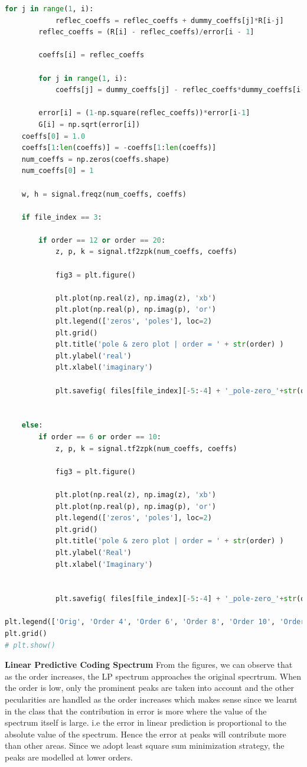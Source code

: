 \documentclass[a4paper]{article}
\begin{document}
\begin{lstlisting}[language=Python, caption=q2a.py]
        for j in range(1, i):
            reflec_coeffs = reflec_coeffs + dummy_coeffs[j]*R[i-j]
        reflec_coeffs = (R[i] - reflec_coeffs)/error[i - 1]

        coeffs[i] = reflec_coeffs

        for j in range(1, i):
            coeffs[j] = dummy_coeffs[j] - reflec_coeffs*dummy_coeffs[i-j]

        error[i] = (1-np.square(reflec_coeffs))*error[i-1]
        G[i] = np.sqrt(error[i])
    coeffs[0] = 1.0
    coeffs[1:len(coeffs)] = -coeffs[1:len(coeffs)]
    num_coeffs = np.zeros(coeffs.shape)
    num_coeffs[0] = 1
    
    w, h = signal.freqz(num_coeffs, coeffs)

    if file_index == 3:

        if order == 12 or order == 20:
            z, p, k = signal.tf2zpk(num_coeffs, coeffs)

            fig3 = plt.figure()
            
            plt.plot(np.real(z), np.imag(z), 'xb')
            plt.plot(np.real(p), np.imag(p), 'or')
            plt.legend(['zeros', 'poles'], loc=2)
            plt.grid()
            plt.title('pole & zero plot | order = ' + str(order) )
            plt.ylabel('real')
            plt.xlabel('imaginary')
            
            plt.savefig( files[file_index][-5:-4] + '_pole-zero_'+str(order)+'_.png')


    else:
        if order == 6 or order == 10:
            z, p, k = signal.tf2zpk(num_coeffs, coeffs)

            fig3 = plt.figure()
            
            plt.plot(np.real(z), np.imag(z), 'xb')
            plt.plot(np.real(p), np.imag(p), 'or')
            plt.legend(['zeros', 'poles'], loc=2)
            plt.grid()
            plt.title('pole & zero plot | order = ' + str(order) )
            plt.ylabel('Real')
            plt.xlabel('Imaginary')
            
    
            plt.savefig( files[file_index][-5:-4] + '_pole-zero_'+str(order)+'_.png')            

plt.legend(['Orig', 'Order 4', 'Order 6', 'Order 8', 'Order 10', 'Order 12', 'Order 20'])
plt.grid()
# plt.show()
\end{lstlisting}



\newpage

\textbf{Linear Predictive Coding Spectrum}
From the figures, we can observe that as the order increases, the LP spectrum approaches the original specrtrum. When the order is low, only the prominent peaks are taken into account and the other pecularities are handled as the order increases which makes sense since we learnt in the class that the contribution in error is more where the value of the spectrum itself is large. i.e the error in linear prediction is proportional to the absolute value of the spectrum. Hence the error at peaks will contribute more than other areas. Since we adopt least square sum minimization strategy, the peaks are modelled at lower orders.  
\end{document}
